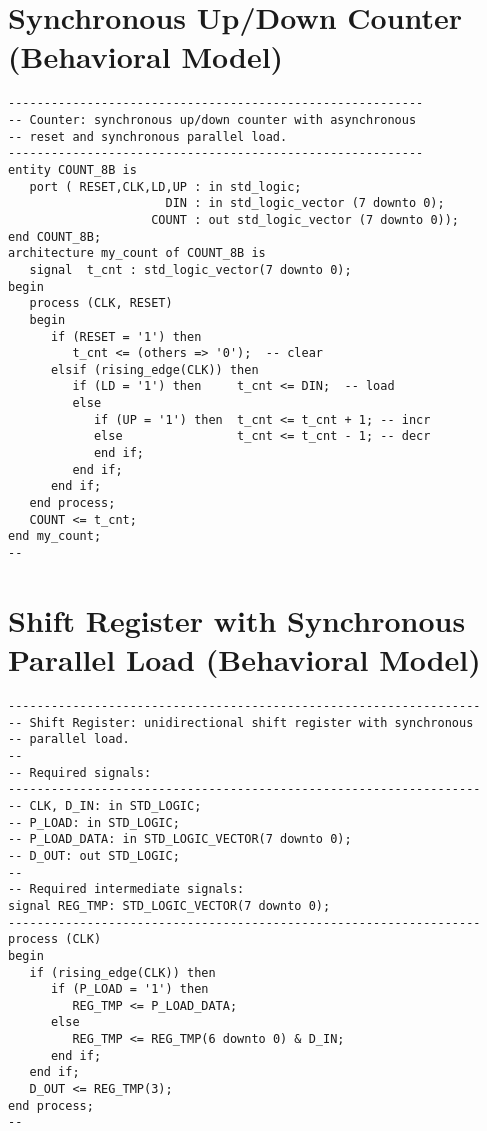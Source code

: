 \section{Synchronous Up/Down Counter (Behavioral Model)}
\noindent
\begin{minipage}{1\linewidth}
\begin{lstlisting}
----------------------------------------------------------
-- Counter: synchronous up/down counter with asynchronous 
-- reset and synchronous parallel load. 
----------------------------------------------------------
entity COUNT_8B is
   port ( RESET,CLK,LD,UP : in std_logic; 
                      DIN : in std_logic_vector (7 downto 0); 
                    COUNT : out std_logic_vector (7 downto 0)); 
end COUNT_8B; 
architecture my_count of COUNT_8B is 
   signal  t_cnt : std_logic_vector(7 downto 0); 
begin          
   process (CLK, RESET) 
   begin
      if (RESET = '1') then    
         t_cnt <= (others => '0');  -- clear
      elsif (rising_edge(CLK)) then
         if (LD = '1') then     t_cnt <= DIN;  -- load
         else 
            if (UP = '1') then  t_cnt <= t_cnt + 1; -- incr
            else                t_cnt <= t_cnt - 1; -- decr
            end if;
         end if;
      end if;
   end process;
   COUNT <= t_cnt; 
end my_count;
--
\end{lstlisting}
\end{minipage}

\section{Shift Register with Synchronous Parallel Load (Behavioral Model)}
\noindent
\begin{minipage}{1\linewidth}
\begin{lstlisting}
------------------------------------------------------------------
-- Shift Register: unidirectional shift register with synchronous 
-- parallel load. 
-- 
-- Required signals: 
------------------------------------------------------------------
-- CLK, D_IN: in STD_LOGIC;
-- P_LOAD: in STD_LOGIC;
-- P_LOAD_DATA: in STD_LOGIC_VECTOR(7 downto 0);
-- D_OUT: out STD_LOGIC; 
-- 
-- Required intermediate signals: 
signal REG_TMP: STD_LOGIC_VECTOR(7 downto 0);
------------------------------------------------------------------
process (CLK)
begin
   if (rising_edge(CLK)) then
      if (P_LOAD = '1') then
         REG_TMP <= P_LOAD_DATA;
      else
         REG_TMP <= REG_TMP(6 downto 0) & D_IN;
      end if;
   end if;
   D_OUT <= REG_TMP(3);
end process;
--
\end{lstlisting}
\end{minipage}

